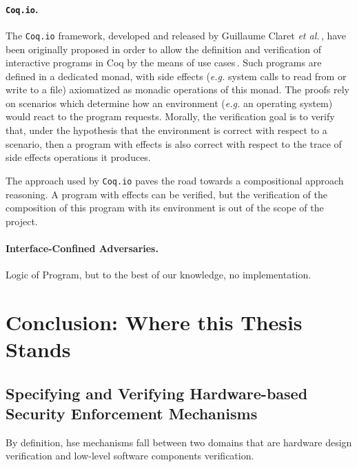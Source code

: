 \paragraph{\texttt{Coq.io}.}
%
The \texttt{Coq.io} framework, developed and released by Guillaume Claret
\emph{et al.}\,\cite{claret2015coqiowww}, have been originally proposed in order
to allow the definition and verification of interactive programs in Coq by the
means of use cases\,\cite{claret2015coqio}.
%
Such programs are defined in a dedicated monad, with side effects (\emph{e.g.}
system calls to read from or write to a file) axiomatized as monadic operations
of this monad.
%
The proofs rely on scenarios which determine how an environment (\emph{e.g.} an
operating system) would react to the program requests.
%
Morally, the verification goal is to verify that, under the hypothesis that the
environment is correct with respect to a scenario, then a program with effects
is also correct with respect to the trace of side effects operations it
produces.

The approach used by \texttt{Coq.io} paves the road towards a compositional
approach reasoning.
%
A program with effects can be verified, but the verification of the composition
of this program with its environment is out of the scope of the project.

\paragraph{Interface-Confined Adversaries.}
%
Logic of Program, but to the best of our knowledge, no implementation.
%

\section{Conclusion: Where this Thesis Stands}
\label{sec:sota:conclusion}


\subsection{Specifying and Verifying Hardware-based Security Enforcement
  Mechanisms}

By definition, \ac{hse} mechanisms fall between two domains that are hardware
design verification and low-level software components verification.

